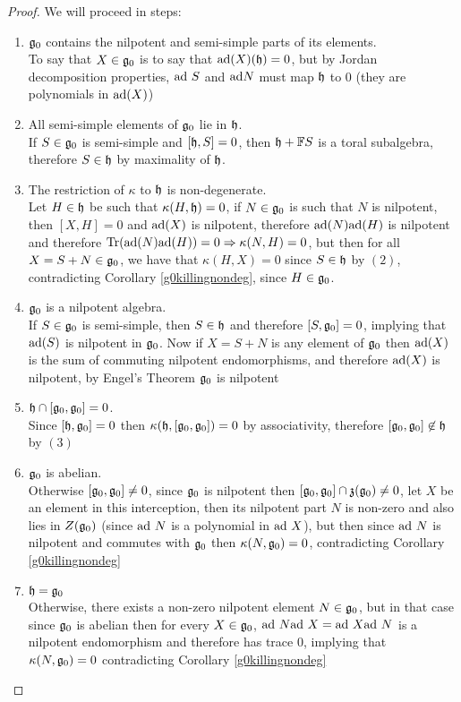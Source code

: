 \begin{proof}
	We will proceed in steps:
	\begin{enumerate}
		\item $\mathfrak{g}_0$ contains the nilpotent and semi-simple parts of its elements.\\
		To say that $X \in \mathfrak{g}_0$ is to say that $\text{ad}(X)(\mathfrak{h})=0$, but by Jordan decomposition properties, $\text{ad} \ S$ and $\text{ad} N$ must map $\mathfrak{h}$ to $0$ (they are polynomials in $\text{ad}(X)$)
		\item All semi-simple elements of $\mathfrak{g}_0$ lie in $\mathfrak{h}$.\\
		If $S \in \mathfrak{g}_0$ is semi-simple and $[\mathfrak{h},S]=0$, then $\mathfrak{h}+\mathbb{F} S$ is a toral subalgebra, therefore $S \in \mathfrak{h}$ by maximality of $\mathfrak{h}$.
		\item The restriction of $\kappa$ to $\mathfrak{h}$ is non-degenerate.\\
		Let $H \in \mathfrak{h}$ be such that $\kappa(H,\mathfrak{h})=0$, if $N \in \mathfrak{g}_0$ is such that $N$ is nilpotent, then $[X,H]=0$ and $\text{ad}(X)$ is nilpotent, therefore $\text{ad}(N)\text{ad}(H)$ is nilpotent and therefore $\text{Tr}(\text{ad}(N)\text{ad}(H))=0 \Rightarrow \kappa(N,H)=0$, but then for all $X=S+N \in \mathfrak{g}_0$, we have that $\kappa(H,X)=0$ since $S \in \mathfrak{h}$ by $(2)$,  contradicting Corollary \ref{g0killingnondeg}, since $H \in \mathfrak{g}_0$.
		\item $\mathfrak{g}_0$ is a nilpotent algebra. \\
		If $S \in \mathfrak{g}_0$ is semi-simple, then $S \in \mathfrak{h}$ and therefore $[S,\mathfrak{g}_0]=0$, implying that $\text{ad}(S)$ is nilpotent in $\mathfrak{g}_0$. Now if $X=S+N$ is any element of $\mathfrak{g}_0$ then $\text{ad}(X)$ is the sum of commuting nilpotent endomorphisms, and therefore $\text{ad}(X)$ is nilpotent, by Engel's Theorem $\mathfrak{g}_0$ is nilpotent
		\item $\mathfrak{h} \cap [\mathfrak{g}_0,\mathfrak{g}_0]=0$.\\
		Since $[\mathfrak{h},\mathfrak{g}_0]=0$ then $\kappa(\mathfrak{h},[\mathfrak{g}_0,\mathfrak{g}_0]) =0$ by associativity, therefore $[\mathfrak{g}_0,\mathfrak{g}_0]\not \in \mathfrak{h}$ by $(3)$
		\item $\mathfrak{g}_0$ is abelian.\\
		Otherwise $[\mathfrak{g}_0,\mathfrak{g}_0]\not=0$, since $\mathfrak{g}_0$ is nilpotent then $[\mathfrak{g}_0,\mathfrak{g}_0]\cap\mathfrak{z}(\mathfrak{g}_0)\not=0$, let $X$ be an element in this interception, then its nilpotent part $N$ is non-zero and also lies in $Z(\mathfrak{g}_0)$ (since $\text{ad}\ N$ is a polynomial in $\text{ad} \ X$), but then since $\text{ad} \ N$ is nilpotent and commutes with $\mathfrak{g}_0$ then $\kappa(N,\mathfrak{g}_0)=0$, contradicting Corollary \ref{g0killingnondeg}
		\item $\mathfrak{h}=\mathfrak{g}_0$\\
		Otherwise, there exists a non-zero nilpotent element $N \in \mathfrak{g}_0$, but in that case since $\mathfrak{g}_0$ is abelian then for every $X \in \mathfrak{g}_0$, $\text{ad} \ N \text{ad} \ X = \text{ad} \ X \text{ad} \ N$ is a nilpotent endomorphism and therefore has trace $0$, implying that $\kappa(N,\mathfrak{g}_0)=0$ contradicting Corollary \ref{g0killingnondeg}
	\end{enumerate}
\end{proof}
